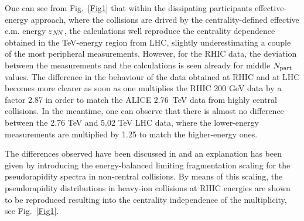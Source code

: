 \documentclass[twocolumn,showpacs,preprintnumbers,prd,superscriptaddress,nofootinbib]{revtex4}
\begin{document}
 One can see from Fig.~\ref{Fig1} that within the dissipating participants 
effective-energy 
 approach,
 where the collisions are drived by the centrality-defined effective c.m. 
 energy $\varepsilon_{N\!N}$, the 
 calculations well reproduce   
  the 
 centrality dependence obtained in the TeV-energy region from LHC,
 slightly underestimating a couple of the most peripheral 
 measurements.  
 However,
 for the RHIC data,
  the deviation between the   
  measurements and the calculations is seen already 
 for middle $N_{\rm part}$ values.
 The difference in the behaviour of the data obtained at RHIC and at LHC 
becomes more clearer as soon as one multiplies the RHIC 200 GeV data by a 
factor 2.87 in order to match the ALICE 2.76~TeV  data from highly central 
collisions. 
 In the meantime, one can observe 
 that there is almost no difference between the 2.76 TeV and 
 5.02 TeV
 LHC data,
 where the lower-energy 
 measurements are 
multiplied by 1.25 to match the higher-energy ones.
 
 The differences 
 observed have been discussed in 
 and an explanation has been given by introducing the 
energy-balanced 
limiting 
fragmentation scaling for the pseudorapidity spectra in 
non-central collisions. By means of this scaling, the pseudorapidity 
distributions 
in 
heavy-ion collisions
at RHIC energies
 are shown to be reproduced 
 resulting into the 
 centrality independence of the 
 multiplicity,
 see Fig.~\ref{Fig1}.
\end{document}
